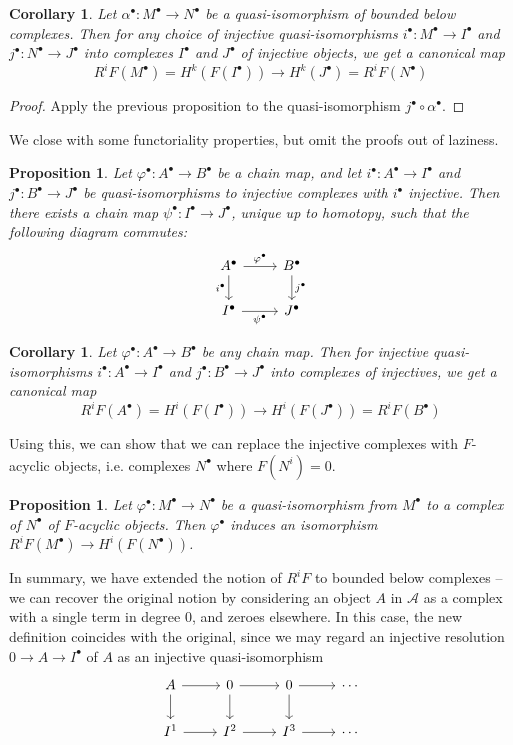 \documentclass[psamsfonts, 12pt]{amsart}
\newtheorem{cor}[thm]{Corollary}
\newtheorem{prop}[thm]{Proposition}
\theoremstyle{definition}
\theoremstyle{remark}
\begin{document}
%
\begin{cor}
Let $\alpha^\bullet : M^\bullet \to N^\bullet$ be a quasi-isomorphism
of bounded below complexes. Then for any choice of injective quasi-isomorphisms
$i^\bullet : M^\bullet \to I^\bullet$ and $j^\bullet : N^\bullet \to J^\bullet$
into complexes $I^\bullet$ and $J^\bullet$ of injective objects, we get a
canonical map
\[
R^iF(M^\bullet) = H^k(F(I^\bullet)) \to H^k(J^\bullet) = R^iF(N^\bullet)
\]
\end{cor}
%
\begin{proof}
Apply the previous proposition to the quasi-isomorphism $j^\bullet \circ \alpha^\bullet$.
\end{proof}
%
We close with some functoriality properties, but omit the proofs out of laziness.
%
\begin{prop}
Let $\varphi^\bullet : A^\bullet \to B^\bullet$ be a chain map, and
let $i^\bullet : A^\bullet \to I^\bullet$ and $j^\bullet : B^\bullet \to J^\bullet$
be quasi-isomorphisms to injective complexes with $i^\bullet$ injective. Then
there exists a chain map $\psi^\bullet : I^\bullet \to J^\bullet$, unique
up to homotopy, such that the following diagram commutes:
\[\begin{tikzcd}
A^\bullet\ar[d, "i^\bullet"']\ar[r, "\varphi^\bullet"]&B^\bullet\ar[d, "j^\bullet"] \\
I^\bullet \ar[r, "\psi^\bullet"'] & J^\bullet
\end{tikzcd}\]
\end{prop}
%
\begin{cor}
Let $\varphi^\bullet : A^\bullet \to B^\bullet$ be any chain map. Then
for injective quasi-isomorphisms $i^\bullet : A^\bullet \to I^\bullet$
and $j^\bullet : B^\bullet \to J^\bullet$ into complexes of injectives,
we get a canonical map
\[
R^iF(A^\bullet) = H^i(F(I^\bullet)) \to H^i(F(J^\bullet)) = R^iF(B^\bullet)
\]
\end{cor}
%
Using this, we can show that we can replace the injective complexes with
$F$-acyclic objects, i.e. complexes $N^\bullet$ where $F(N^i) = 0$.
%
\begin{prop}
Let $\varphi^\bullet : M^\bullet \to N^\bullet$ be a quasi-isomorphism
from $M^\bullet$ to a complex of $N^\bullet$ of $F$-acyclic objects. Then
$\varphi^\bullet$ induces an isomorphism $R^iF(M^\bullet) \to H^i(F(N^\bullet))$.
\end{prop}
%
In summary, we have extended the notion of $R^iF$ to bounded below complexes --
we can recover the original notion by considering an object $A$ in $\mathcal{A}$
as a complex with a single term in degree $0$, and zeroes elsewhere.
In this case, the new definition coincides with the original, since we may
regard an injective resolution $0 \to A \to I^\bullet$ of $A$ as an
injective quasi-isomorphism
\[\begin{tikzcd}
A \ar[d]\ar[r] & 0 \ar[d]\ar[r] & 0 \ar[d]\ar[r] & \cdots \\
I^1 \ar[r] & I^2 \ar[r] & I^3 \ar[r] & \cdots
\end{tikzcd}\]
%
\end{document}

